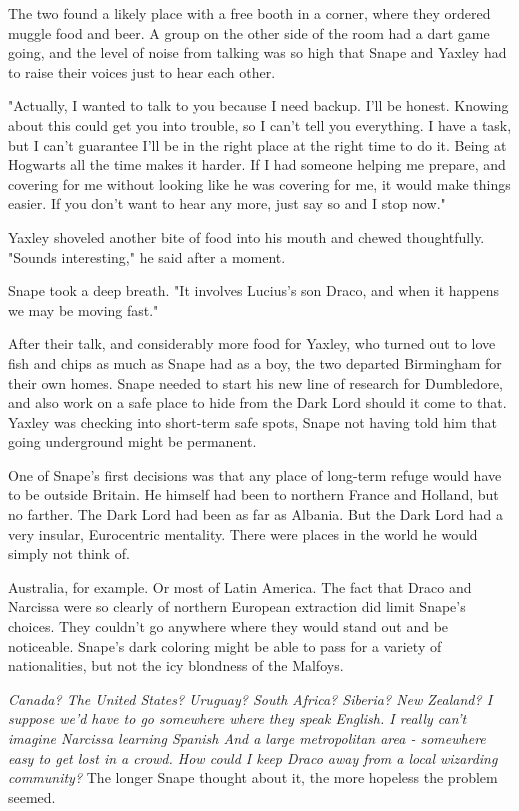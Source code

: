 The two found a likely place with a free booth in a corner, where they ordered muggle food and beer. A group on the other side of the room had a dart game going, and the level of noise from talking was so high that Snape and Yaxley had to raise their voices just to hear each other.

"Actually, I wanted to talk to you because I need backup. I'll be honest. Knowing about this could get you into trouble, so I can't tell you everything. I have a task, but I can't guarantee I'll be in the right place at the right time to do it. Being at Hogwarts all the time makes it harder. If I had someone helping me prepare, and covering for me without looking like he was covering for me, it would make things easier. If you don't want to hear any more, just say so and I stop now."

Yaxley shoveled another bite of food into his mouth and chewed thoughtfully. "Sounds interesting," he said after a moment.

Snape took a deep breath. "It involves Lucius's son Draco, and when it happens we may be moving fast."

After their talk, and considerably more food for Yaxley, who turned out to love fish and chips as much as Snape had as a boy, the two departed Birmingham for their own homes. Snape needed to start his new line of research for Dumbledore, and also work on a safe place to hide from the Dark Lord should it come to that. Yaxley was checking into short-term safe spots, Snape not having told him that going underground might be permanent.

One of Snape's first decisions was that any place of long-term refuge would have to be outside Britain. He himself had been to northern France and Holland, but no farther. The Dark Lord had been as far as Albania. But the Dark Lord had a very insular, Eurocentric mentality. There were places in the world he would simply not think of.

Australia, for example. Or most of Latin America. The fact that Draco and Narcissa were so clearly of northern European extraction did limit Snape's choices. They couldn't go anywhere where they would stand out and be noticeable. Snape's dark coloring might be able to pass for a variety of nationalities, but not the icy blondness of the Malfoys.

\emph{Canada? The United States? Uruguay? South Africa? Siberia? New Zealand? I suppose we'd have to go somewhere where they speak English. I really can't imagine Narcissa learning Spanish{\el} And a large metropolitan area - somewhere easy to get lost in a crowd. How could I keep Draco away from a local wizarding community?} The longer Snape thought about it, the more hopeless the problem seemed.

